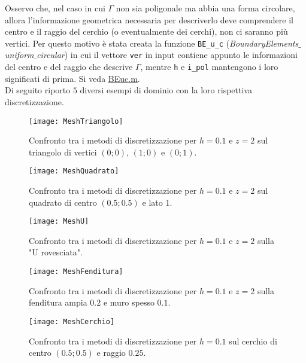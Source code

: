 Osservo che, nel caso in cui $\Gamma$ non sia poligonale ma abbia una forma circolare, allora l'informazione geometrica necessaria per descriverlo deve comprendere il centro e il raggio del cerchio (o eventualmente dei cerchi), non ci saranno più vertici. Per questo motivo è stata creata la funzione \verb|BE_u_c| (\textit{BoundaryElements$\_$uniform$\_$circular}) in cui il vettore \verb|ver| in input contiene appunto le informazioni del centro e del raggio che descrive $\Gamma$, mentre \verb|h| e \verb|i_pol| mantengono i loro significati di prima. Si veda \href{https://github.com/Daldossi/BEM/blob/main/BE_u_c.m}{BEuc.m}. \\
Di seguito riporto $5$ diversi esempi di dominio con la loro rispettiva discretizzazione.
\begin{figure}[h]
	\centering
	\texttt{[image: MeshTriangolo]}
	\caption{Confronto tra i metodi di discretizzazione per $h= 0.1$ e $z= 2$ sul triangolo di vertici $(0;0)$, $(1;0)$ e $(0;1)$.}
	\label{MeshT}
\end{figure}
\begin{figure}[h]
	\centering
	\texttt{[image: MeshQuadrato]}
	\caption{Confronto tra i metodi di discretizzazione per $h= 0.1$ e $z= 2$ sul quadrato di centro $(0.5;0.5)$ e lato $1$.}
	\label{MeshQ}
\end{figure}
\begin{figure}[h]
	\centering
	\texttt{[image: MeshU]}
	\caption{Confronto tra i metodi di discretizzazione per $h= 0.1$ e $z= 2$ sulla "U rovesciata".}
	\label{MeshU}
\end{figure}
\begin{figure}[h]
	\centering
	\texttt{[image: MeshFenditura]}
	\caption{Confronto tra i metodi di discretizzazione per $h= 0.1$ e $z= 2$ sulla fenditura ampia $0.2$ e muro spesso $0.1$.}
	\label{MeshF}
\end{figure}
\begin{figure}[h]
	\centering
	\texttt{[image: MeshCerchio]}
	\caption{Confronto tra i metodi di discretizzazione per $h= 0.1$ sul cerchio di centro $(0.5;0.5)$ e raggio $0.25$.}
	\label{MeshC}
\end{figure}



